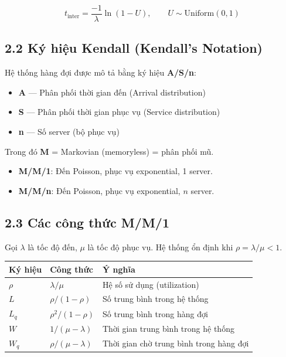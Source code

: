 \documentclass[12pt,a4paper]{article}
\begin{document}
\[
  t_{\text{inter}} = \frac{-1}{\lambda} \ln(1 - U), \qquad U \sim \text{Uniform}(0,1)
\]

\subsection{2.2 Ký hiệu Kendall (Kendall's Notation)}

Hệ thống hàng đợi được mô tả bằng ký hiệu \textbf{A/S/n}:
\begin{itemize}[nosep]
  \item \textbf{A} — Phân phối thời gian đến (Arrival distribution)
  \item \textbf{S} — Phân phối thời gian phục vụ (Service distribution)
  \item \textbf{n} — Số server (bộ phục vụ)
\end{itemize}

Trong đó \textbf{M} = Markovian (memoryless) = phân phối mũ.

\begin{itemize}[nosep]
  \item \textbf{M/M/1}: Đến Poisson, phục vụ exponential, 1 server.
  \item \textbf{M/M/n}: Đến Poisson, phục vụ exponential, $n$ server.
\end{itemize}

\subsection{2.3 Các công thức M/M/1}

Gọi $\lambda$ là tốc độ đến, $\mu$ là tốc độ phục vụ. Hệ thống ổn định khi $\rho = \lambda/\mu < 1$.

\begin{center}
\renewcommand{\arraystretch}{1.4}
\begin{tabular}{lll}
  \toprule
  \textbf{Ký hiệu} & \textbf{Công thức} & \textbf{Ý nghĩa} \\
  \midrule
  $\rho$  & $\lambda / \mu$          & Hệ số sử dụng (utilization) \\
  $L$     & $\rho / (1 - \rho)$      & Số trung bình trong hệ thống \\
  $L_q$   & $\rho^2 / (1 - \rho)$    & Số trung bình trong hàng đợi \\
  $W$     & $1 / (\mu - \lambda)$    & Thời gian trung bình trong hệ thống \\
  $W_q$   & $\rho / (\mu - \lambda)$ & Thời gian chờ trung bình trong hàng đợi \\
  \bottomrule
\end{tabular}
\end{center}
\end{document}
